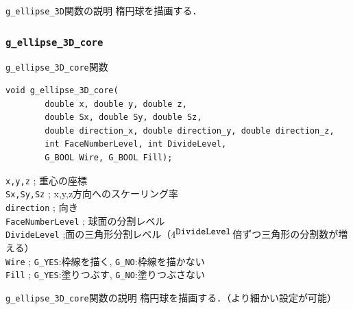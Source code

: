 \documentclass[platex,a4paper,12pt]{jsarticle}%
\begin{document}
\begin{itembox}[l]{\texttt{g\_ellipse\_3D}関数の説明}
楕円球を描画する．
\end{itembox}



\clearpage
\subsubsection{\texttt{g\_ellipse\_3D\_core}}

\begin{itembox}[l]{\texttt{g\_ellipse\_3D\_core}関数}
\begin{verbatim}
void g_ellipse_3D_core(
        double x, double y, double z,
        double Sx, double Sy, double Sz,
        double direction_x, double direction_y, double direction_z,
        int FaceNumberLevel, int DivideLevel, 
        G_BOOL Wire, G_BOOL Fill);   
\end{verbatim}
\verb|x,y,z| ; 重心の座標\\
\verb|Sx,Sy,Sz| ; x,y,z方向へのスケーリング率\\
\verb|direction| ; 向き\\
\verb|FaceNumberLevel| ; 球面の分割レベル\\
\verb|DivideLevel| ;面の三角形分割レベル（$4^{\verb|DivideLevel|}$倍ずつ三角形の分割数が増える）\\
\verb|Wire| ; \verb|G_YES|:枠線を描く, \verb|G_NO|:枠線を描かない \\
\verb|Fill| ; \verb|G_YES|:塗りつぶす, \verb|G_NO|:塗りつぶさない
\end{itembox}

\begin{itembox}[l]{\texttt{g\_ellipse\_3D\_core}関数の説明}
楕円球を描画する．（より細かい設定が可能）
\end{itembox}
\end{document}
